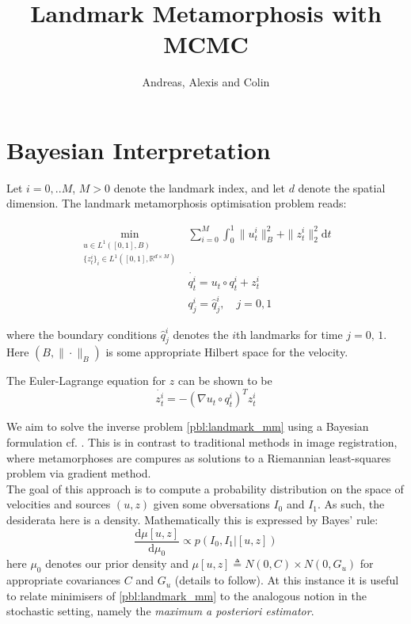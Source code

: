 \documentclass{article}
\newcommand{\dd}[2]{\frac{\diff#1}{\diff#2}}
\newcommand{\norm}[2]{\| #1 \|_{ #2 }}
\newcommand{\bnorm}[1]{\norm{ #1 }{B}}
\newcommand{\ltwonorm}[1]{\norm{ #1 }{2}}
\newcommand{\diff}[1]{\text{d} #1}
\begin{document}
\title{Landmark Metamorphosis with MCMC}
\author{Andreas, Alexis and Colin}
\maketitle

\section{Bayesian Interpretation}

Let $i=0,..M$, $M>0$ denote the landmark index, and let $d$ denote the spatial
dimension. The landmark metamorphosis optimisation problem reads:

\begin{subequations}\label{pbl:landmark_mm}
\begin{align}
\min_{\substack{u\in L^1([0,1],B)\\ \{z^i_t\}_i \in L^1([0,1],\mathbb{R}^{d\times M})}} &
\sum_{i=0}^M \int_0^1 \bnorm{u^i_t}^2 + \ltwonorm{z^i_t}^2 \diff{t}\\
            & \dot{q^i_t} = u_t \circ q^i_t + z^i_t \label{eq:ele_q} \\
            & q^i_j = \hat q^i_j, \quad j=0,1 \label{eq:ele_q_bcs}
\end{align}
\end{subequations}

where the boundary conditions $\hat q^i_j$ denotes the $i$th landmarks for time
$j=0,\,1$. Here $(B,\bnorm{\cdot})$ is some appropriate Hilbert space for the
velocity.

The Euler-Lagrange equation for $z$ can be shown to be
\begin{equation}\label{eq:ele_z}
\dot{z^i_t} = - (\nabla u_t \circ q^i_t)^T z^i_t
\end{equation}

We aim to solve the inverse problem \eqref{pbl:landmark_mm} using a Bayesian
formulation cf. \cite{dashti2017bayesian,dashti2013map}. This is in contrast to
traditional methods in image registration, where metamorphoses are compures as
solutions to a Riemannian least-squares problem via gradient method.\\

The goal of this approach is to compute a probability distribution on the space
of velocities and sources $(u,z)$ given some obversations $I_0$ and $I_1$. As
such, the desiderata here is a density. Mathematically this is expressed by
Bayes' rule:
\[
\dd{\mu[u,z]}{\mu_0} \propto p(I_0, I_1 | [u, z])
\]
here $\mu_0$ denotes our prior density and $\mu[u, z] \triangleq N(0,C)\times
N(0,G_u)$ for appropriate covariances $C$ and $G_u$ (details to follow). At this
instance it is useful to relate minimisers of \eqref{pbl:landmark_mm} to the
analogous notion in the stochastic setting, namely the \textit{maximum a
posteriori estimator}.
\end{document}
